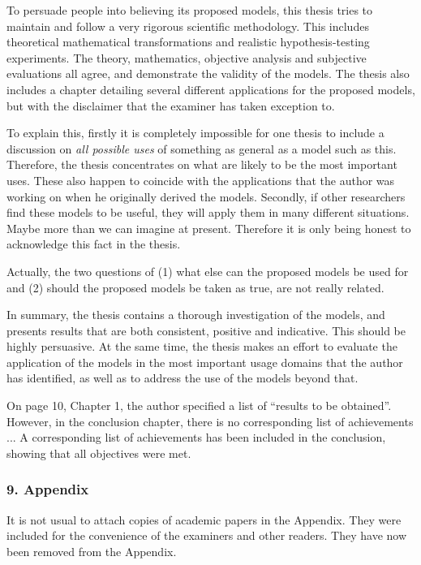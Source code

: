     {
     To persuade people into believing its proposed models, this thesis tries to maintain and follow a very rigorous scientific methodology. 
     This includes theoretical mathematical transformations and realistic hypothesis-testing experiments.
     The theory, mathematics, objective analysis and subjective evaluations all agree, and demonstrate the validity of the models.
      The thesis also includes a chapter detailing several different applications for the proposed models, but with the disclaimer that the examiner has taken exception to.
      
      To explain this, firstly it is completely impossible for one thesis to include a discussion on \textit{all possible uses} of something as general as a model such as this. Therefore, the thesis concentrates on what are likely to be the most important uses. These also happen to coincide with the applications that the author was working on when he originally derived the models.
      Secondly, if other researchers find these models to be useful, they will apply them in many different situations. Maybe more than we can imagine at present. Therefore it is only being honest to acknowledge this fact in the thesis.

Actually, the two questions of (1) what else can the proposed models be used for and (2) should the proposed models be taken as true, are not really related.

In summary, the thesis contains a thorough investigation of the models, and presents results that are both consistent, positive and indicative. This should be highly persuasive.
At the same time, the thesis makes an effort to evaluate the application of the models in the most important usage domains that the author has identified, as well as to address the use of the models beyond that.
    }

\replyToComment
    {
      On page 10, Chapter 1, the author specified a list of ``results to be obtained''.
      However, in the conclusion chapter, there is no corresponding list of achievements ...
    }
    {
      A corresponding list of achievements has been included in the conclusion, showing that all objectives were met.
    }
    
\subsubsection*{9. Appendix}

\replyToComment
    {It is not usual to attach copies of academic papers in the Appendix.}
    {They were included for the convenience of the examiners and other readers. They have now been removed from the Appendix.}



